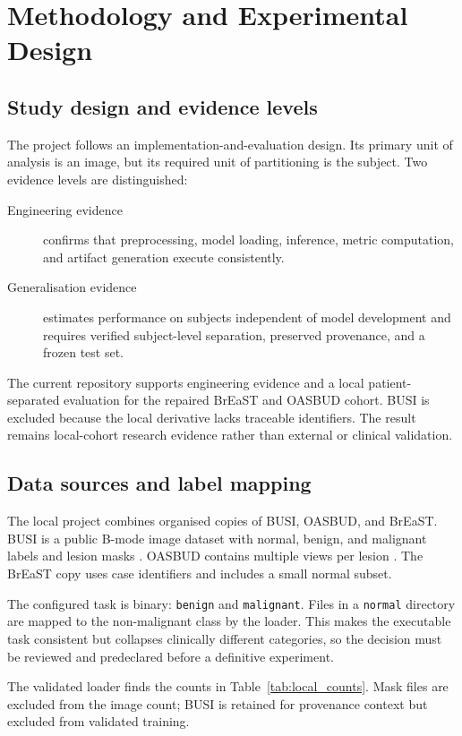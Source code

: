 \chapter{Methodology and Experimental Design}
\label{ch:methodology}

\section{Study design and evidence levels}
The project follows an implementation-and-evaluation design. Its primary unit of analysis is an image, but its required unit of partitioning is the subject. Two evidence levels are distinguished:

\begin{description}
    \item[Engineering evidence] confirms that preprocessing, model loading, inference, metric computation, and artifact generation execute consistently.
    \item[Generalisation evidence] estimates performance on subjects independent of model development and requires verified subject-level separation, preserved provenance, and a frozen test set.
\end{description}

The current repository supports engineering evidence and a local patient-separated evaluation for the repaired BrEaST and OASBUD cohort. BUSI is excluded because the local derivative lacks traceable identifiers. The result remains local-cohort research evidence rather than external or clinical validation.

\section{Data sources and label mapping}
The local project combines organised copies of BUSI, OASBUD, and BrEaST. BUSI is a public B-mode image dataset with normal, benign, and malignant labels and lesion masks \citep{AlDhabyani2020}. OASBUD contains multiple views per lesion \citep{Piotrzkowska2017}. The BrEaST copy uses case identifiers and includes a small normal subset.

The configured task is binary: \texttt{benign} and \texttt{malignant}. Files in a \texttt{normal} directory are mapped to the non-malignant class by the loader. This makes the executable task consistent but collapses clinically different categories, so the decision must be reviewed and predeclared before a definitive experiment.

The validated loader finds the counts in Table~\ref{tab:local_counts}. Mask files are excluded from the image count; BUSI is retained for provenance context but excluded from validated training.

